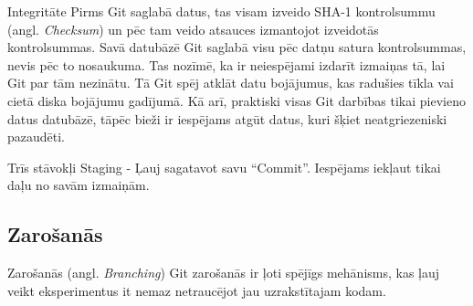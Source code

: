 Integritāte
Pirms Git saglabā datus, tas visam izveido SHA-1 kontrolsummu (angl. \textit{Checksum}) un pēc tam veido atsauces izmantojot izveidotās kontrolsummas. Savā datubāzē Git saglabā visu pēc datņu satura kontrolsummas, nevis pēc to nosaukuma. Tas nozīmē, ka ir neiespējami izdarīt izmaiņas tā, lai Git par tām nezinātu. Tā Git spēj atklāt datu bojājumus, kas radušies tīkla vai cietā diska bojājumu gadījumā. Kā arī, praktiski visas Git darbības tikai pievieno datus datubāzē, tāpēc bieži ir iespējams atgūt datus, kuri šķiet neatgriezeniski pazaudēti.

Trīs stāvokļi
Staging - Ļauj sagatavot savu ``Commit''. Iespējams iekļaut tikai daļu no savām izmaiņām.

\subsection{Zarošanās}
Zarošanās (angl. \textit{Branching})
Git zarošanās ir ļoti spējīgs mehānisms, kas ļauj veikt eksperimentus it nemaz netraucējot jau uzrakstītajam kodam.
